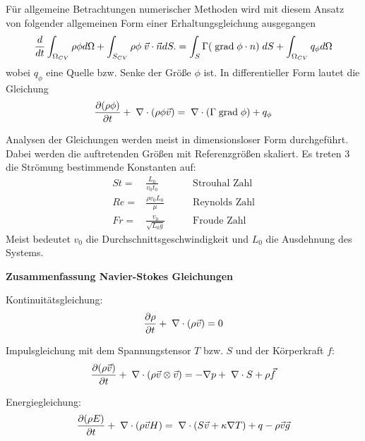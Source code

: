 Für allgemeine Betrachtungen numerischer Methoden wird mit diesem Ansatz von
folgender allgemeinen Form einer Erhaltungsgleichung ausgegangen
\begin{equation}
\frac{d}{dt} \int_{\Omega_{CV}} \rho \phi d \Omega 
+
\int_{S_{CV}} \rho \phi \; \vec{v}\cdot \vec{n} d S.
= 
\int_S \Gamma (\;\mbox{grad}\; \phi \cdot n)  \; d S
+
\int_{\Omega_{CV}} q_\phi d \Omega \label{eq:transport_int}
\end{equation} 
wobei $q_\phi$ eine Quelle bzw. Senke der Größe $\phi$ ist.
In differentieller Form lautet die Gleichung
\begin{equation}
\frac{\partial (\rho \phi)}{\partial t} + \;\nabla \cdot (\rho \phi \vec{v}) =
\;\nabla \cdot (\Gamma \;\mbox{grad}\; \phi)  + q_\phi \label{eq:transport_dif}
\end{equation}


Analysen der Gleichungen werden meist in dimensionsloser Form
durchgeführt. Dabei werden die auftretenden Größen mit Referenzgrößen skaliert.
Es treten 3 die Strömung bestimmende Konstanten auf:
\begin{eqnarray}
St  = & \frac{L_0}{v_0 t_0} &\qquad \mbox{Strouhal Zahl} \\
Re  = & \frac{\rho v_0 L_0}{\mu} &\qquad \mbox{Reynolds Zahl}
\label{eq:reynold_ferziger} \\
Fr  = & \frac{v_0}{\sqrt{L_0 g}} &\qquad \mbox{Froude Zahl} 
\end{eqnarray}
Meist bedeutet $v_0$ die Durchschnittsgeschwindigkeit und $L_0$ die Ausdehnung
des Systems.




{\bf Zusammenfassung Navier-Stokes Gleichungen}

Kontinuitätsgleichung:
\begin{equation}
\frac{\partial \rho }{\partial t} + \;\nabla \cdot (\rho \vec{v}) = 0
\end{equation}

Impulsgleichung mit dem Spannungstensor $T$ bzw. $S$ und der Körperkraft $f$:
\begin{equation}
\frac{\partial (\rho \vec{v})}{\partial t} + \;\nabla \cdot (\rho \vec{v}\otimes\vec{v})
= - \nabla p + \;\nabla \cdot S  + \rho \vec{f}
\end{equation}

Energiegleichung:
\begin{equation}
\frac{\partial (\rho E)}{\partial t} + \;\nabla \cdot (\rho \vec{v} H) = 
\;\nabla \cdot \left(S \vec{v} + \kappa \nabla T
\right) + q - \rho
\vec{v}\vec{g}
\end{equation}

